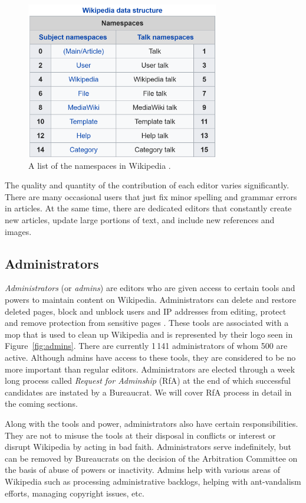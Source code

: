 \begin{figure}[htp]
    \centering
    \includegraphics[width=0.75\textwidth]{images/namespaces.PNG}
    \caption{A list of the namespaces in Wikipedia \cite{wiki:namespace}.}
    \label{fig:namespace}
\end{figure}

The quality and quantity of the contribution of each editor varies significantly. There are many occasional users that just fix minor spelling and grammar errors in articles. At the same time, there are dedicated editors that constantly create new articles, update large portions of text, and include new references and images.   

\subsection{Administrators}
\textit{Administrators} (or \textit{admins}) are editors who are given access to certain tools and powers to maintain content on Wikipedia. Administrators can delete and restore deleted pages, block and unblock users and IP addresses from editing, protect and remove protection from sensitive pages \cite{wiki:admins}. These tools are associated with a mop that is used to clean up Wikipedia and is represented by their logo seen in Figure~\ref{fig:admins}. 
There are currently 1\,141 administrators of whom 500 are active. Although admins have access to these tools, they are considered to be no more important than regular editors. Administrators are elected through a week long process called \textit{Request for Adminship} (RfA) at the end of which successful candidates are instated by a Bureaucrat. We will cover RfA process in detail in the coming sections. 

Along with the tools and power, administrators also have certain responsibilities. They are not to misuse the tools at their disposal in conflicts or interest or disrupt Wikipedia by acting in bad faith. Administrators serve indefinitely, but can be removed  by Bureaucrats on the decision of the Arbitration Committee on the basis of abuse of powers or inactivity. Admins help with various areas of Wikipedia such as processing administrative backlogs, helping with ant-vandalism efforts, managing copyright issues, etc. 

